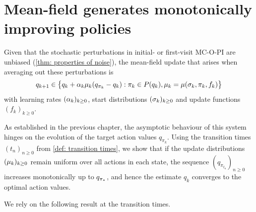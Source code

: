 
\section{Mean-field generates monotonically improving policies}

Given that the stochastic perturbations in initial- or first-visit MC-O-PI are unbiased (\autoref{thm: properties of noise}),
the mean-field update that arises when averaging out these perturbations is
\begin{align}
\label{eq: deterministic mcopi}
    q_{k+1}
    \in
    \big\{ q_k + \alpha_k \mu_k ( q_{\pi_k} - q_k )
    :
    \pi_k \in P(q_k),
    \mu_k = \mu(\sigma_k, \pi_k, f_k)
    \big\}
\end{align}
with learning rates $(\alpha_k)_{k\ge 0}$, start distributions $(\sigma_k)_{k\ge 0}$ and update functions $(f_k)_{k\ge 0}$.

As established in the previous chapter, the asymptotic behaviour of this system hinges on the evolution of the target action values $q_{\pi_k}$.
Using the transition times $(t_n)_{n \ge 0}$ from \autoref{def: transition times}, we show that
if the update distributions $(\mu_k)_{k\ge 0}$ remain uniform over all actions in each state,
the sequence $(q_{\pi_{t_n}})_{n \ge 0}$ increases monotonically up to $q_{{\pi}_*}$,
and hence the estimate $q_k$ converges to the optimal action values.

We rely on the following result at the transition times.

